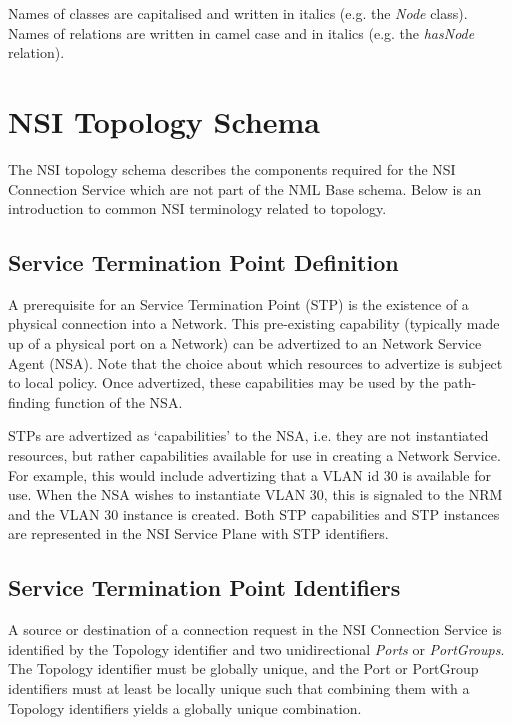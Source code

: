 \documentclass[12pt]{article}  %
\begin{document}
Names of classes are capitalised and written in italics (e.g. the \emph{Node} class).
Names of relations are written in camel case and in italics (e.g. the \emph{hasNode} relation).




\section{NSI Topology Schema}\label{sec:schema}

The NSI topology schema describes the components required for the NSI Connection Service which are not part of the NML Base schema. Below is an introduction to common NSI terminology related to topology.

\subsection{Service Termination Point Definition} %
\label{sub:service_termination_point_definition}

A prerequisite for an Service Termination Point (STP) is the existence of a physical connection into a Network. This pre-existing capability (typically made up of a physical port on a Network) can be advertized to an Network Service Agent (NSA). Note that the choice about which resources to advertize is subject to local policy. Once advertized, these capabilities may be used by the path-finding function of the NSA.

STPs are advertized as `capabilities' to the NSA, i.e. they are not instantiated resources, but rather capabilities available for use in creating a Network Service. For example, this would include advertizing that a VLAN id 30 is available for use. When the NSA wishes to instantiate VLAN 30, this is signaled to the NRM and the VLAN 30 instance is created. Both STP capabilities and STP instances are represented in the NSI Service Plane with STP identifiers.


\subsection{Service Termination Point Identifiers}

A source or destination of a connection request in the NSI Connection Service is identified by 
the Topology identifier and two unidirectional \emph{Ports} or \emph{PortGroups}. The Topology identifier must be globally unique, and the Port or PortGroup identifiers must at least be locally unique such that combining them with a Topology identifiers yields a globally unique combination.
\end{document}

